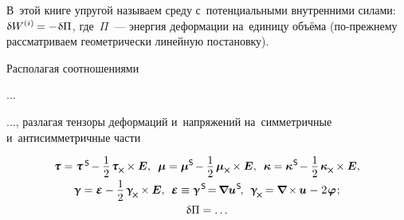 \begin{otherlanguage}{russian}
В~этой книге упругой называем среду с~потенциальными внутренними силами: ${\variation{\internalwork} = - \hspace{.16ex} \variation{\Pi}}$, где~$\Pi$~--- энергия деформации на~единицу объёма (по\hbox{-}прежнему рассматриваем геометрически линейную постановку).

Располагая соотношениями

...

..., разлагая тензоры деформаций и~напряжений на~симметричные и~антисимметричные части

\nopagebreak\begin{equation}
\begin{array}{c}
\forcestresstensor = \forcestresstensor^{\hspace{.32ex}\mathsf{S}} \hspace{-0.25ex} - \displaystyle \onehalf \hspace{.2ex} \forcestresstensor_{\hspace{-0.1ex}\Xcompanion} \hspace{-0.1ex} \times \bm{E} , \;\:
%
\couplestresstensor = \couplestresstensor^{\mathsf{S}} \hspace{-0.25ex} - \displaystyle \onehalf \hspace{.32ex} \couplestresstensor_{\Xcompanion} \hspace{-0.1ex} \times \bm{E} , \;\:
%
\wrynesstensor = \wrynesstensor^{\hspace{.12ex}\mathsf{S}} \hspace{-0.25ex} - \displaystyle \onehalf \hspace{.32ex} \wrynesstensor_{\Xcompanion} \hspace{-0.1ex} \times \bm{E} ,
\\[.6em]
%
\distortiontensor = \mathboldepsilon - \displaystyle \onehalf \hspace{.32ex} \distortiontensor_{\hspace{-0.25ex}\Xcompanion} \hspace{-0.1ex} \times \bm{E} , \:\:
%
\mathboldepsilon \equiv \distortiontensor^{\hspace{.2ex}\mathsf{S}} \hspace{-0.32ex} = \hspace{-0.2ex} \boldnabla {\fieldofdisplacements}^{\hspace{0.1ex}\mathsf{S}} \hspace{-0.25ex} , \:\:
%
\distortiontensor_{\hspace{-0.25ex}\Xcompanion} \hspace{-0.16ex}
= \boldnabla \hspace{-0.16ex} \times \hspace{-0.1ex} \fieldofdisplacements \hspace{.12ex} - \hspace{.12ex} 2 \hspace{.16ex} \fieldofrotations \hspace{.16ex} ;
\\[.6em]
%
\variation{\Pi} = \ldots
\end{array}
\end{equation}


\end{otherlanguage}
